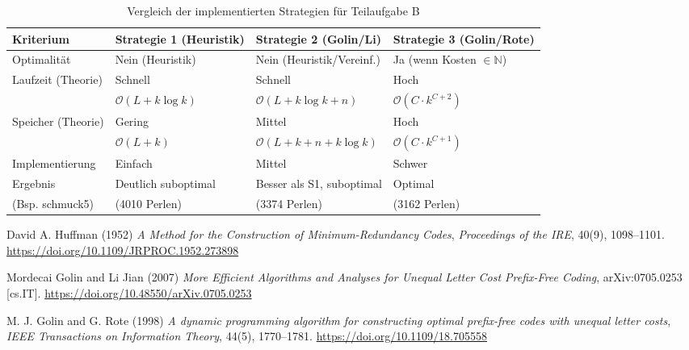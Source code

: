 \documentclass[a4paper,10pt,ngerman]{scrartcl}
\begin{document}
\begin{table}[h!]
\centering
\begin{tabular}{|l|l|l|l|}
\hline
\textbf{Kriterium} & \textbf{Strategie 1 (Heuristik)} & \textbf{Strategie 2 (Golin/Li)} & \textbf{Strategie 3 (Golin/Rote)} \\ \hline \hline
Optimalität & Nein (Heuristik) & Nein (Heuristik/Vereinf.) & Ja (wenn Kosten $\in \mathbb{N}$) \\ \hline
Laufzeit (Theorie) & Schnell & Schnell & Hoch \\
& $\mathcal{O}(L + k \log k)$ & $\mathcal{O}(L + k \log k + n)$ & $\mathcal{O}(C \cdot k^{C+2})$ \\ \hline
Speicher (Theorie) & Gering & Mittel & Hoch \\
& $\mathcal{O}(L + k)$ & $\mathcal{O}(L + k + n + k \log k)$ & $\mathcal{O}(C \cdot k^{C+1})$ \\ \hline
Implementierung & Einfach & Mittel & Schwer \\ \hline
Ergebnis & Deutlich suboptimal & Besser als S1, suboptimal & Optimal \\
(Bsp. schmuck5) & (4010 Perlen) & (3374 Perlen) & (3162 Perlen) \\ \hline
\end{tabular}
\caption{Vergleich der implementierten Strategien für Teilaufgabe B}
\label{tab:strategievergleich}
\end{table}

\begin{thebibliography}{9}
David A. Huffman (1952) \emph{A Method for the Construction of Minimum-Redundancy Codes}, 
\emph{Proceedings of the IRE}, 40(9), 1098--1101. 
\url{https://doi.org/10.1109/JRPROC.1952.273898}

Mordecai Golin and Li Jian (2007) \emph{More Efficient Algorithms and Analyses for Unequal Letter Cost Prefix-Free Coding}, 
arXiv:0705.0253 [cs.IT]. \url{https://doi.org/10.48550/arXiv.0705.0253}

M. J. Golin and G. Rote (1998) \emph{A dynamic programming algorithm for constructing optimal prefix-free codes with unequal letter costs}, 
\emph{IEEE Transactions on Information Theory}, 44(5), 1770--1781. 
\url{https://doi.org/10.1109/18.705558}


\end{thebibliography}
\end{document}
